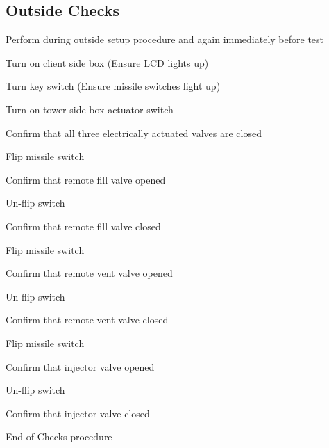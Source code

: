 \subsection{Outside Checks}
Perform during outside setup procedure and again immediately before test
\begin{checklist}
    \item Turn on client side box (Ensure LCD lights up)
    \item Turn key switch (Ensure missile switches light up)
    \item Turn on tower side box actuator switch
    \item Confirm that all three electrically actuated valves are closed
    \item Flip \rfill{} missile switch
    \begin{checklist}
        \item Confirm that remote fill valve opened
    \end{checklist}
    \item Un-flip \rfill{} switch
    \begin{checklist}
        \item Confirm that remote fill valve closed
    \end{checklist}

    \item Flip \rvent{} missile switch
    \begin{checklist}
        \item Confirm that remote vent valve opened
    \end{checklist}
    \item Un-flip \rvent{} switch
    \begin{checklist}
        \item Confirm that remote vent valve closed
    \end{checklist}

    \item Flip \inj{} missile switch
    \begin{checklist}
        \item Confirm that injector valve opened
    \end{checklist}
    \item Un-flip \inj{} switch
    \begin{checklist}
        \item Confirm that injector valve closed
    \end{checklist}
\end{checklist}
End of Checks procedure




